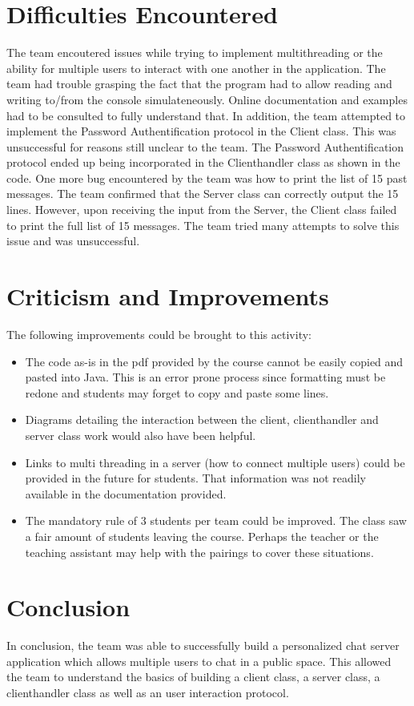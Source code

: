 \documentclass[11pt,letterpaper]{article}
\begin{document}
\section{Difficulties Encountered}
The team encoutered issues while trying to implement multithreading or the ability for multiple users to interact with one another in the application. The team had trouble grasping the fact that the program had to allow reading and writing to/from the console simulateneously. Online documentation and examples had to be consulted to fully understand that. In addition, the team attempted to implement the Password Authentification protocol in the Client class. This was unsuccessful for reasons still unclear to the team.  The Password Authentification protocol ended up being incorporated in the Clienthandler class as shown in the code. One more bug encountered by the team was how to print the list of 15 past messages.  The team confirmed that the Server class can correctly output the 15 lines. However, upon receiving the input from the Server, the Client class failed to print the full list of 15 messages. The team tried many attempts to solve this issue and was unsuccessful. 

\section{Criticism and Improvements}
The following improvements could be brought to this activity:
\begin{itemize}
  \item The code as-is in the pdf provided by the course cannot be easily copied and pasted into Java. This is an error prone process since formatting must be redone and students may forget to copy and paste some lines.
  \item Diagrams detailing the interaction between the client, clienthandler and server class work would also have been helpful.
  \item Links to multi threading in a server (how to connect multiple users) could be provided in the future for students. That information was not readily available in the documentation provided.
   \item The mandatory rule of 3 students per team could be improved. The class saw a fair amount of students leaving the course. Perhaps the teacher or the teaching assistant may help with the pairings to cover these situations.
\end{itemize}

\section{Conclusion}
In conclusion, the team was able to successfully build a personalized chat server application which allows multiple users to chat in a public space. This allowed the team to understand the basics of building a client class, a server class, a clienthandler class as well as an user interaction protocol.
\end{document}
